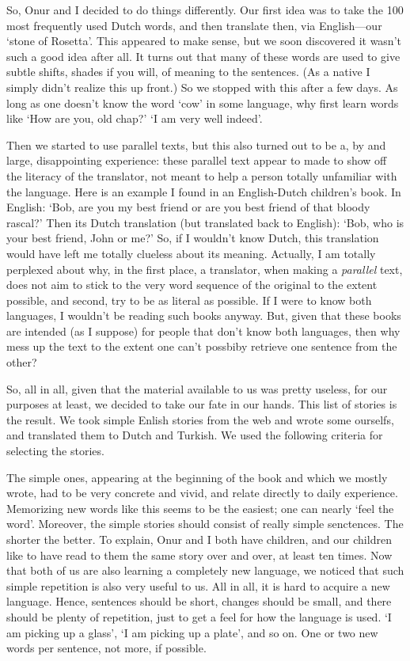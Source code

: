 So, Onur and I decided to do things differently. Our first idea was to take the 100 most frequently used Dutch words, and then translate then, via English---our `stone of Rosetta'. This appeared to make sense, but we soon discovered it wasn't such a good idea after all. It turns out that many of these words are used to give subtle shifts, shades if you will, of meaning to the sentences. (As a native I simply didn't realize  this up front.) So we stopped with this after a few days. As long as one doesn't know the word `cow' in some language, why first learn words like `How are you, old chap?' `I am very well indeed'. 

Then we started to use parallel texts, but this also turned out to be a, by and large, disappointing experience: these parallel text appear to made to show off the literacy of the translator,  not meant to help a person totally unfamiliar with the language. Here is an example I found in an English-Dutch children's book. In English: ‘Bob, are you my best friend or are you best friend of that bloody rascal?’ Then  its Dutch translation (but translated back to English): `Bob, who is your best friend, John or me?' So, if I wouldn't know Dutch, this translation would have left me totally clueless about its meaning. Actually, I am totally perplexed about why, in the first place, a translator, when making a \emph{parallel} text, does not aim to  stick to the very word sequence of the original to the extent possible, and second, try to be as literal as possible. If I were to know both languages, I wouldn't be reading such books anyway. But, given that these books are intended (as I suppose) for people that don't know both languages, then why mess up the text to the extent one can't possbiby retrieve one sentence from the other? 

So, all in all, given that the material available to us was pretty useless, for our purposes at least, we  decided to take our fate in our hands. This list of stories is the result. We took simple Enlish stories from the web and wrote some ourselfs, and translated them to Dutch and Turkish. We used the following criteria for selecting the stories. 

The simple ones, appearing at the beginning of the book and which we mostly wrote,  had to be very concrete and vivid, and relate directly to daily experience.  Memorizing new words like this seems to be the easiest; one can nearly `feel the word'. Moreover, the simple stories should consist of really simple senctences. The shorter the better. To explain, Onur and I both have children, and  our children like to have read to them the same story over and over, at least ten times. Now that both of us are also learning a completely new language, we noticed that such simple repetition is  also very useful to us. All in all, it is hard to acquire a new language. Hence, sentences should be short, changes should be small, and there should be plenty of repetition, just to get a feel for how the language is used. `I am picking up a glass', `I am picking up a plate', and so on. One or two new words per sentence, not more, if possible. 

